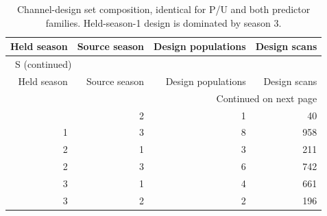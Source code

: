 \documentclass[10pt,a4paper]{article}
\renewcommand{\thetable}{S\arabic{table}}
\begin{document}
\begingroup\small
\setlength{\tabcolsep}{3.5pt}
\renewcommand{\arraystretch}{1.10}
\begin{longtable}{rrrr}
\caption{Channel-design set composition, identical for P/U and both predictor families. Held-season-1 design is dominated by season 3.}\label{tab:designcomposition}\\
\toprule
Held season & Source season & Design populations & Design scans \\
\midrule
\endfirsthead
\multicolumn{4}{l}{\tablename~\thetable{} (continued)}\\
\toprule
Held season & Source season & Design populations & Design scans \\
\midrule
\endhead
\midrule
\multicolumn{4}{r}{Continued on next page}\\
\endfoot
\bottomrule
\endlastfoot
1 & 2 & 1 & 40 \\
1 & 3 & 8 & 958 \\
2 & 1 & 3 & 211 \\
2 & 3 & 6 & 742 \\
3 & 1 & 4 & 661 \\
3 & 2 & 2 & 196 \\
\end{longtable}
\endgroup
\end{document}
